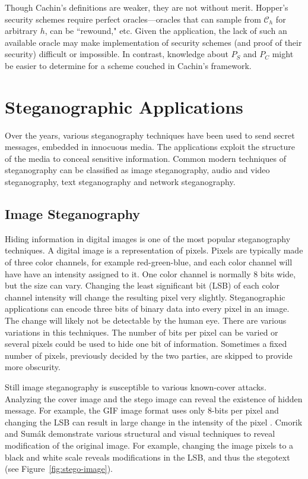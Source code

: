 \documentclass[11pt]{article}
\newcommand\channel{\ensuremath{\mathcal C}}
\begin{document}
Though Cachin's definitions are weaker, they are not without merit.
Hopper's security schemes require perfect oracles---oracles that can
sample from $\channel_h$ for arbitrary $h$, can be ``rewound," etc.
Given the application, the lack of such an available oracle may make
implementation of security schemes (and proof of their security)
difficult or impossible. In contrast, knowledge about $P_S$ and
$P_C$ might be easier to determine for a scheme couched in Cachin's
framework.

\section{Steganographic Applications}
Over the years, various steganography techniques have been used to
send secret messages, embedded in innocuous media. The applications
exploit the structure of the media to conceal sensitive information.
Common modern techniques of steganography can be classified as image
steganography, audio and video steganography, text steganography and
network steganography.

\subsection{Image Steganography}
Hiding information in digital images is one of the most popular
steganography techniques. A digital image is a representation of
pixels. Pixels are typically made of three color channels, for example
red-green-blue, and each color channel will have have an intensity
assigned to it. One color channel is normally 8 bits wide, but the
size can vary. Changing the least significant bit (LSB) of each color
channel intensity will change the resulting pixel very slightly.
Steganographic applications can encode three bits of binary data into
every pixel in an image. The change will likely not be detectable by
the human eye. There are various variations in this techniques. The
number of bits per pixel can be varied or several pixels could be used
to hide one bit of information. Sometimes a fixed number of pixels,
previously decided by the two parties, are skipped to provide more
obscurity.

Still image steganography is susceptible to various known-cover
attacks. Analyzing the cover image and the stego image can reveal the
existence of hidden message. For example, the GIF image format uses
only 8-bits per pixel and changing the LSB can result in large change
in the intensity of the pixel \cite{Meghanathan}. Cmorik and Sum\'ak
\cite{Cmorik} demonstrate various structural and visual techniques to
reveal modification of the original image. For example, changing the
image pixels to a black and white scale reveals modifications in the
LSB, and thus the stegotext \cite{Cmorik} (see Figure~\ref{fig:stego-image}).
\end{document}
